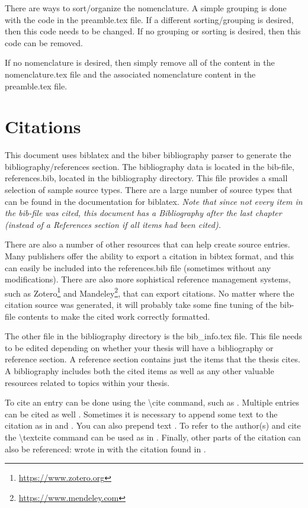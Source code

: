     There are ways to sort/organize the nomenclature.
    A simple grouping is done with the code in the preamble.tex file.
    If a different sorting/grouping is desired, then this code needs to be changed.
    If no grouping or sorting is desired, then this code can be removed.

    If no nomenclature is desired, then simply remove all of the content in the nomenclature.tex file and the associated nomenclature content in the preamble.tex file.

\section{Citations} \label{sec:Citations}
    This document uses biblatex and the biber bibliography parser to generate the bibliography/references section.
    The bibliography data is located in the bib-file, references.bib, located in the bibliography directory.
    This file provides a small selection of sample source types.
    There are a large number of source types that can be found in the documentation for biblatex.
    \emph{Note that since not every item in the bib-file was cited, this document has a Bibliography after the last chapter (instead of a References section if all items had been cited).}

    There are also a number of other resources that can help create source entries.
    Many publishers offer the ability to export a citation in bibtex format, and this can easily be included into the references.bib file (sometimes without any modifications).
    There are also more sophistical reference management systems, such as Zotero\footnote{ \url{https://www.zotero.org}} and Mandeley\footnote{\url{https://www.mendeley.com}}, that can export citations.
    No matter where the citation source was generated, it will probably take some fine tuning of the bib-file contents to make the cited work correctly formatted.

    The other file in the bibliography directory is the bib\_info.tex file.
    This file needs to be edited depending on whether your thesis will have a bibliography or reference section.
    A reference section contains just the items that the thesis cites.
    A bibliography includes both the cited items as well as any other valuable resources related to topics within your thesis.

    To cite an entry can be done using the \textbackslash cite command, such as \cite{cpthesis_github}.
    Multiple entries can be cited as well \cite{drela1986a,dryden1943a,einstein1905,lopez2007a}.
    Sometimes it is necessary to append some text to the citation as in \cite[135]{dryden1943a} and \cite[section 2]{head1958a}.
    You can also prepend text \cite[such as][120]{Koutsovasilis2008}.
    To refer to the author(s) and cite the \textbackslash textcite command can be used as in \textcite{dirac1981}.
    Finally, other parts of the citation can also be referenced: \citeauthor{einstein1905} wrote  in \citeyear{einstein1905} with the citation found in \cite{einstein1905}.

